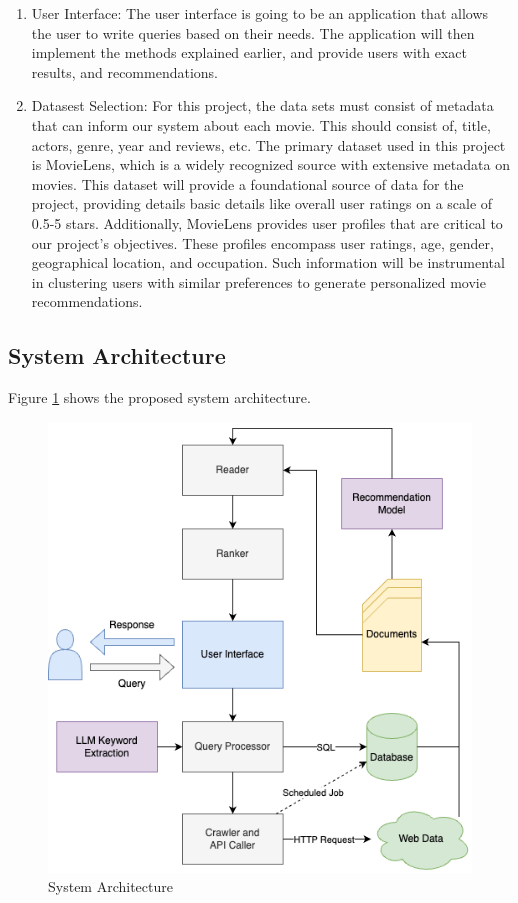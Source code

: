 \documentclass[journal]{IEEEtran}
\begin{document}
\begin{enumerate}
    \item {User Interface}: The user interface is going to be an application that allows the user to write queries based on their needs. The application will then implement the methods explained earlier, and provide users with exact results, and recommendations.
    
    \item{Datasest Selection}: For this project, the data sets must consist of metadata that can inform our system about each movie. This should consist of, title, actors, genre, year and reviews, etc. The primary dataset used in this project is MovieLens, which is a widely recognized source with extensive metadata on movies. This dataset will provide a foundational source of data for the project, providing details basic details like overall user ratings on a scale of 0.5-5 stars. Additionally, MovieLens provides user profiles that are critical to our project's objectives. These profiles encompass user ratings, age, gender, geographical location, and occupation. Such information will be instrumental in clustering users with similar preferences to generate personalized movie recommendations.

    
\end{enumerate}

\subsection{System Architecture}
Figure \ref{fig:sysarch} shows the proposed system architecture.

\begin{figure}
    \centering
    \includegraphics[width=1.0\linewidth]{doc//proposal//assets/sysarch.drawio.png}
    \caption{System Architecture}
    \label{fig:sysarch}
\end{figure}
\end{document}
